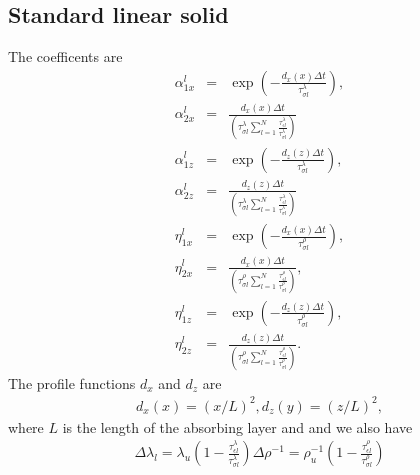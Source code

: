 \documentclass[11pt]{article}
\begin{document}
\subsection{Standard linear solid}
The coefficents are
\begin{eqnarray*}
\alpha^l_{1x}  & = & \exp\left(-\frac{d_x(x)\Delta t}
                          {\tau^{\lambda}_{\sigma l}}\right),        \\
\alpha^l_{2x}  & = & \frac{d_x(x)\Delta t}
                  {(\tau^{\lambda}_{\sigma l}
                   \sum_{l=1}^N \frac{\tau^{\lambda}_{\epsilon l}}
                                     {\tau^{\lambda}_{\sigma l}  })
                  }                                                  \\
\alpha^l_{1z}  & = & \exp\left(-\frac{d_z(z)\Delta t}
                          {\tau^{\lambda}_{\sigma l}}\right),        \\
\alpha^l_{2z}  & = & \frac{d_z(z)\Delta t}
                  {(\tau^{\lambda}_{\sigma l}
                   \sum_{l=1}^N \frac{\tau^{\lambda}_{\epsilon l}}
                                     {\tau^{\lambda}_{\sigma l}  })
                  }                                                  \\
\eta^l_{1x}  & = & \exp\left(-\frac{d_x(x)\Delta t}
                          {\tau^{\rho}_{\sigma l}}\right),           \\
\eta^l_{2x}  & = & \frac{d_x(x)\Delta t}
                  {(\tau^{\rho}_{\sigma l}
                   \sum_{l=1}^N \frac{\tau^{\rho}_{\epsilon l}}
                                     {\tau^{\rho}_{\sigma l}  })
                  },                                                 \\
\eta^l_{1z}  & = & \exp\left(-\frac{d_z(z)\Delta t}
                          {\tau^{\rho}_{\sigma l}}\right),           \\
\eta^l_{2z}  & = & \frac{d_z(z)\Delta t}
                  {(\tau^{\rho}_{\sigma l}
                   \sum_{l=1}^N \frac{\tau^{\rho}_{\epsilon l}}
                                     {\tau^{\rho}_{\sigma l}  })
                  }.
\end{eqnarray*}
The profile functions $d_x$ and $d_z$ are
\begin{eqnarray*}
  d_x(x) = (x/L)^2,
  d_z(y) = (z/L)^2,
\end{eqnarray*}
where $L$ is the length of the absorbing layer and 
and we also have
\begin{eqnarray}
\Delta \lambda_l = \lambda_u\left(1-\frac{\tau^{\lambda}_{\epsilon l}}{\tau^{\lambda}_{\sigma l}}\right)
\Delta \rho^{-1} = \rho^{-1}_u\left(1-\frac{\tau^{\rho}_{\epsilon l}}{\tau^{\rho}_{\sigma l}}\right)
\end{eqnarray}
\end{document}
